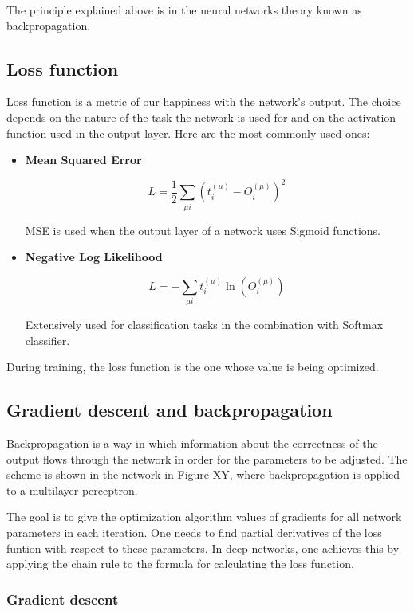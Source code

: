 The principle explained above is in the neural networks theory known as backpropagation.

\subsection{Loss function}

Loss function is a metric of our happiness with the network's output. The choice depends on the nature of the task the network is used for and on the activation function used in the output layer. Here are the most commonly used ones:

\begin{itemize}
\item \textbf{Mean Squared Error}

$$ 	
L =  \frac{1}{2} \sum\limits_{\mu i} \left( t_{i}^{(\mu)} - O_{i}^{(\mu)} \right)^2
$$

MSE is used when the output layer of a network uses Sigmoid functions.

\item \textbf{Negative Log Likelihood} 

$$ 	
L = - \sum\limits_{\mu i}  t_{i}^{(\mu)} \ln (O_{i}^{(\mu)})
$$

Extensively used for classification tasks in the combination with Softmax classifier. 
\end{itemize}   

During training, the loss function is the one whose value is being optimized.

\subsection{Gradient descent and backpropagation}

Backpropagation is a way in which information about the correctness of the output flows through the network in order for the parameters to be adjusted. The scheme is shown in the network in Figure XY, where backpropagation is applied to a multilayer perceptron. 

The goal is to give the optimization algorithm values of gradients for all network parameters in each iteration. One needs to find partial derivatives of the loss funtion with respect to these parameters. In deep networks, one achieves this by applying the chain rule to the formula for calculating the loss function.

\subsubsection{Gradient descent}

